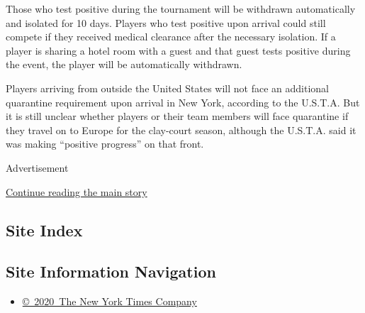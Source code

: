 Those who test positive during the tournament will be withdrawn
automatically and isolated for 10 days. Players who test positive upon
arrival could still compete if they received medical clearance after the
necessary isolation. If a player is sharing a hotel room with a guest
and that guest tests positive during the event, the player will be
automatically withdrawn.

Players arriving from outside the United States will not face an
additional quarantine requirement upon arrival in New York, according to
the U.S.T.A. But it is still unclear whether players or their team
members will face quarantine if they travel on to Europe for the
clay-court season, although the U.S.T.A. said it was making ``positive
progress'' on that front.

Advertisement

\protect\hyperlink{after-bottom}{Continue reading the main story}

\hypertarget{site-index}{%
\subsection{Site Index}\label{site-index}}

\hypertarget{site-information-navigation}{%
\subsection{Site Information
Navigation}\label{site-information-navigation}}

\begin{itemize}
\tightlist
\item
  \href{https://help.nytimes3xbfgragh.onion/hc/en-us/articles/115014792127-Copyright-notice}{©~2020~The
  New York Times Company}
\end{itemize}

